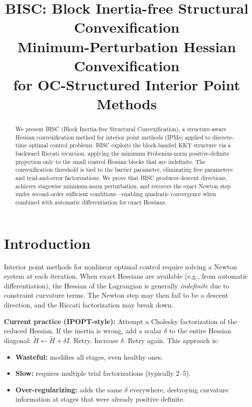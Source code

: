 \documentclass[11pt]{article}
\title{BISC: Block Inertia-free Structural Convexification\\[6pt]
\large Minimum-Perturbation Hessian Convexification\\
for OC-Structured Interior Point Methods}
\author{}
\date{}
\begin{document}
\maketitle

\begin{abstract}
We present BISC (Block Inertia-free Structural Convexification), a structure-aware
Hessian convexification method for interior point methods (IPMs) applied to
discrete-time optimal control problems. BISC exploits the block-banded KKT structure
via a backward Riccati recursion, applying the minimum Frobenius-norm positive-definite
projection only to the small control Hessian blocks that are indefinite. The
convexification threshold is tied to the barrier parameter, eliminating free parameters
and trial-and-error factorizations. We prove that BISC produces descent directions,
achieves stagewise minimum-norm perturbation, and recovers the exact Newton step
under second-order sufficient conditions---enabling quadratic convergence when
combined with automatic differentiation for exact Hessians.
\end{abstract}

\section{Introduction}

Interior point methods for nonlinear optimal control require solving a Newton
system at each iteration. When exact Hessians are available (e.g., from automatic
differentiation), the Hessian of the Lagrangian is generally \emph{indefinite}
due to constraint curvature terms. The Newton step may then fail to be a descent
direction, and the Riccati factorization may break down.

\textbf{Current practice (IPOPT-style):} Attempt a Cholesky factorization of
the reduced Hessian. If the inertia is wrong, add a scalar $\delta$ to the entire
Hessian diagonal: $\tilde{H} \leftarrow \tilde{H} + \delta I$. Retry. Increase
$\delta$. Retry again. This approach is:
\begin{itemize}
  \item \textbf{Wasteful:} modifies all stages, even healthy ones.
  \item \textbf{Slow:} requires multiple trial factorizations (typically 2--5).
  \item \textbf{Over-regularizing:} adds the same $\delta$ everywhere, destroying
        curvature information at stages that were already positive definite.
\end{itemize}
\end{document}
